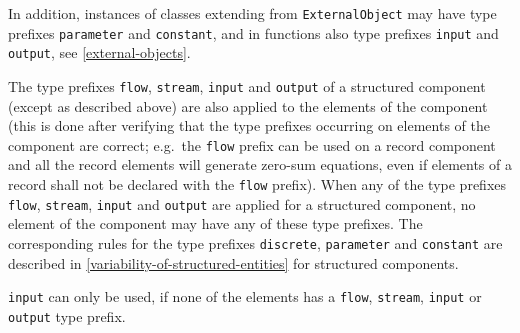 In addition, instances of classes extending from \lstinline!ExternalObject! may have type prefixes \lstinline!parameter! and \lstinline!constant!, and in functions also type prefixes
\lstinline!input! and \lstinline!output!, see \cref{external-objects}.

The type prefixes \lstinline!flow!, \lstinline!stream!, \lstinline!input! and \lstinline!output! of a structured component (except as described above) are also applied to the elements of the component (this is done after verifying that the type prefixes occurring on elements of the component are correct; e.g.\ the \lstinline!flow! prefix can be used on a record component and all the record elements will generate zero-sum equations, even if elements of a record shall not be declared with the \lstinline!flow! prefix).  When any of the type prefixes \lstinline!flow!, \lstinline!stream!, \lstinline!input! and \lstinline!output! are applied for a structured component, no element of the component may have any of these type prefixes.  The corresponding rules for the type prefixes \lstinline!discrete!, \lstinline!parameter! and \lstinline!constant! are described in \cref{variability-of-structured-entities} for structured components.

\begin{example}
\lstinline!input! can only be used, if none of the elements has a \lstinline!flow!, \lstinline!stream!, \lstinline!input! or \lstinline!output! type prefix.
\end{example}

